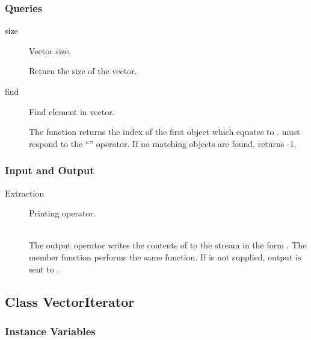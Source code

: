 \subsubsection{Queries}
\label{sec:vector-queries}

\begin{description}

\item[size] \texonly{---} Vector size.\\

Return the size of the vector.

\item[find] \texonly{---} Find element in vector.\\

The  function returns the index of the first object which
equates to .   must respond to the ``\code{==}''
operator.  If no matching objects are found,  returns -1.
\end{description}

\subsubsection{Input and Output}
\label{sec:vector-io}

\begin{description}
\item[Extraction] \texonly{---} Printing operator.\\
\\

The output operator \code{<<} writes the contents of  to
the stream  in the form .  The member
function  performs the same function.  If  is
not supplied, output is sent to .
\end{description}

\subsection{Class VectorIterator}
\label{sec:vector-iterator}


\subsubsection{Instance Variables}

